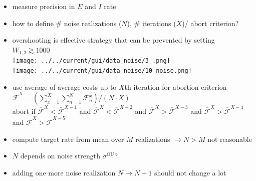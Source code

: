 \documentclass[]{article}
\begin{document}
\begin{itemize}
	\item measure precision in $E$ and $I$ rate
	\item how to define \# noise realizations ($N$), \# iterations ($X$)/ abort criterion?
	\item overshooting is effective strategy that can be prevented by setting $W_{1,2} \gtrsim 1000$\\
	\texttt{[image: ../../current/gui/data\_noise/3\_.png]}\\	
	\texttt{[image: ../../current/gui/data\_noise/10\_noise.png]}
	\item use average of average costs up to $X$th iteration for abortion criterion\\
	$\overline{\mathcal{F}}^X = (\sum_{x=1}^{X} \sum_{n=1}^{N} \mathcal{F}_n^x) / (N \cdot X)$\\
	abort if $\overline{\mathcal{F}}^X < \overline{\mathcal{F}}^{X-1}$ and $\overline{\mathcal{F}}^X < \overline{\mathcal{F}}^{X-2}$ and $\overline{\mathcal{F}}^X > \overline{\mathcal{F}}^{X-3}$ and $\overline{\mathcal{F}}^X > \overline{\mathcal{F}}^{X-4}$ and $\overline{\mathcal{F}}^X > \overline{\mathcal{F}}^{X-5}$
	\item compute target rate from mean over $M$ realizations $\rightarrow N > M$ not reasonable
	\item $N$ depends on noise strength $\sigma^\text{OU}$?
	\item adding one more noise realization $N \rightarrow N+1$ should not change a lot
\end{itemize}
\end{document}
